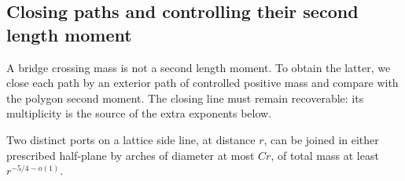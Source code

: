 \subsection{Closing paths and controlling their second length moment}

A bridge crossing mass is not a second length moment. To obtain the latter, we close each path by an exterior path of controlled positive mass and compare with the polygon second moment. The closing line must remain recoverable: its multiplicity is the source of the extra exponents below.

\begin{lemma}
\label{lem:08-arch-kernel}
Two distinct ports on a lattice side line, at distance \(r\), can be joined in either
prescribed half-plane by arches of diameter at most \(Cr\), of total
mass at least \(r^{-5/4-o(1)}\).
\end{lemma}
